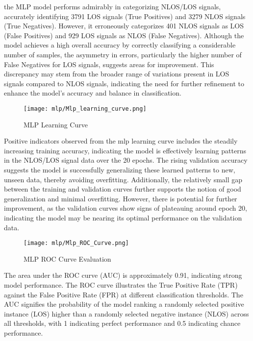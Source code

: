 the MLP model performs admirably in categorizing NLOS/LOS signals, accurately identifying 3791 LOS signals (True Positives) and 3279 NLOS signals (True Negatives). However, it erroneously categorizes 401 NLOS signals as LOS (False Positives) and 929 LOS signals as NLOS (False Negatives). Although the model achieves a high overall accuracy by correctly classifying a considerable number of samples, the asymmetry in errors, particularly the higher number of False Negatives for LOS signals, suggests areas for improvement. This discrepancy may stem from the broader range of variations present in LOS signals compared to NLOS signals, indicating the need for further refinement to enhance the model's accuracy and balance in classification.

\begin{figure}[H] 
  \centering
  \texttt{[image: mlp/Mlp\_learning\_curve.png]}
  \caption{MLP Learning Curve}\label{fig:mlp_learning_curve}
\end{figure}

Positive indicators observed from the mlp learning curve includes the steadily increasing training accuracy, indicating the model is effectively learning patterns in the NLOS/LOS signal data over the 20 epochs. The rising validation accuracy suggests the model is successfully generalizing these learned patterns to new, unseen data, thereby avoiding overfitting. Additionally, the relatively small gap between the training and validation curves further supports the notion of good generalization and minimal overfitting. However, there is potential for further improvement, as the validation curves show signs of plateauing around epoch 20, indicating the model may be nearing its optimal performance on the validation data.

\begin{figure}[H] 
  \centering
  \texttt{[image: mlp/Mlp\_ROC\_Curve.png]}
  \caption{MLP ROC Curve Evaluation}\label{fig:mpl_roc_curve}
\end{figure}

The area under the ROC curve (AUC) is approximately 0.91, indicating strong model performance. The ROC curve illustrates the True Positive Rate (TPR) against the False Positive Rate (FPR) at different classification thresholds. The AUC signifies the probability of the model ranking a randomly selected positive instance (LOS) higher than a randomly selected negative instance (NLOS) across all thresholds, with 1 indicating perfect performance and 0.5 indicating chance performance.

